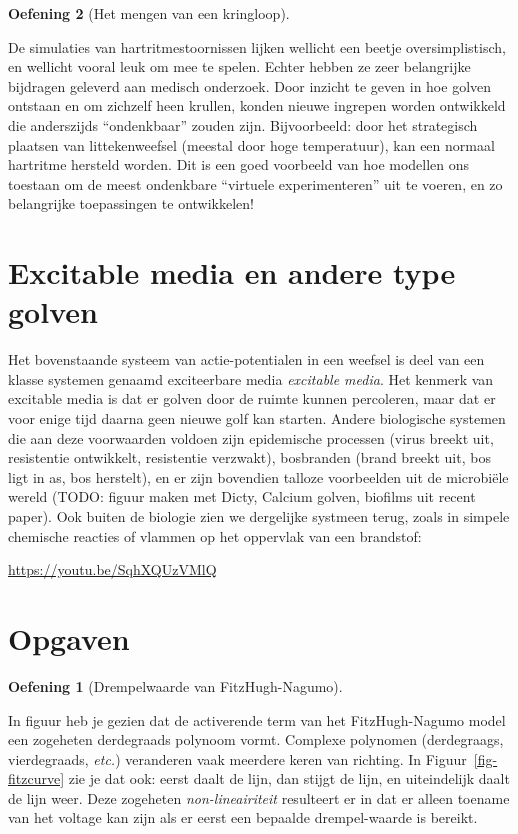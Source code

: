 \documentclass[
  a4paper,
]{scrbook}
\theoremstyle{definition}
\newtheorem{exercise}{Oefening}[chapter]
\theoremstyle{remark}
\newcounter{quartocallouttipno}
\newcommand{\quartocallouttip}[1]{\refstepcounter{quartocallouttipno}\label{#1}}
\begin{document}
\begin{exercise}[Het mengen van een
kringloop]
\begin{tcolorbox}
\quartocallouttip{tip-unthinkable} 

De simulaties van hartritmestoornissen lijken wellicht een beetje
oversimplistisch, en wellicht vooral leuk om mee te spelen. Echter
hebben ze zeer belangrijke bijdragen geleverd aan medisch onderzoek.
Door inzicht te geven in hoe golven ontstaan en om zichzelf heen
krullen, konden nieuwe ingrepen worden ontwikkeld die anderszijds
``ondenkbaar'' zouden zijn. Bijvoorbeeld: door het strategisch plaatsen
van littekenweefsel (meestal door hoge temperatuur), kan een normaal
hartritme hersteld worden. Dit is een goed voorbeeld van hoe modellen
ons toestaan om de meest ondenkbare ``virtuele experimenteren'' uit te
voeren, en zo belangrijke toepassingen te ontwikkelen!

\end{tcolorbox}

\section{Excitable media en andere type
golven}\label{excitable-media-en-andere-type-golven}

Het bovenstaande systeem van actie-potentialen in een weefsel is deel
van een klasse systemen genaamd exciteerbare media \emph{excitable
media}. Het kenmerk van excitable media is dat er golven door de ruimte
kunnen percoleren, maar dat er voor enige tijd daarna geen nieuwe golf
kan starten. Andere biologische systemen die aan deze voorwaarden
voldoen zijn epidemische processen (virus breekt uit, resistentie
ontwikkelt, resistentie verzwakt), bosbranden (brand breekt uit, bos
ligt in as, bos herstelt), en er zijn bovendien talloze voorbeelden uit
de microbiële wereld (TODO: figuur maken met Dicty, Calcium golven,
biofilms uit recent paper). Ook buiten de biologie zien we dergelijke
systmeen terug, zoals in simpele chemische reacties of vlammen op het
oppervlak van een brandstof:

\url{https://youtu.be/SqhXQUzVMlQ}

\section{Opgaven}\label{opgaven-11}

\begin{exercise}[Drempelwaarde van
FitzHugh-Nagumo]\protect\hypertarget{exr-drempelwaardefh}{}\label{exr-drempelwaardefh}

In figuur heb je gezien dat de activerende term van het FitzHugh-Nagumo
model een zogeheten derdegraads polynoom vormt. Complexe polynomen
(derdegraags, vierdegraads, \emph{etc.}) veranderen vaak meerdere keren
van richting. In Figuur~\ref{fig-fitzcurve} zie je dat ook: eerst daalt
de lijn, dan stijgt de lijn, en uiteindelijk daalt de lijn weer. Deze
zogeheten \emph{non-lineairiteit} resulteert er in dat er alleen toename
van het voltage kan zijn als er eerst een bepaalde drempel-waarde is
bereikt.


\end{exercise}
\end{exercise}
\end{document}
